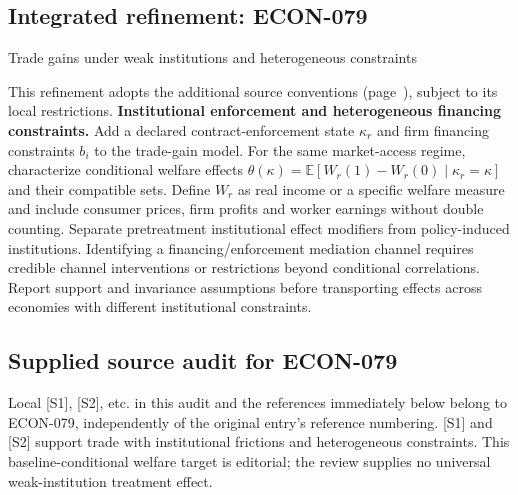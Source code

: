 \documentclass[11pt,a4paper]{article}
\begin{document}
\subsection*{Integrated refinement: ECON-079}
{\sffamily\small\color{muted}Trade gains under weak institutions and heterogeneous constraints\par}
This refinement adopts the additional source conventions
(page~\pageref{audited:conventions}), subject to its local restrictions.
\textbf{Institutional enforcement and heterogeneous financing constraints.}
Add a declared contract-enforcement state $\kappa_r$ and firm financing
constraints $b_i$ to the trade-gain model. For the same market-access regime,
characterize conditional welfare effects
$\theta(\kappa)=\mathbb E[W_r(1)-W_r(0)\mid\kappa_r=\kappa]$ and their compatible
sets. Define $W_r$ as real income or a specific welfare measure and include
consumer prices, firm profits and worker earnings without double counting.
Separate pretreatment institutional effect modifiers from policy-induced
institutions. Identifying a financing/enforcement mediation channel requires
credible channel interventions or restrictions beyond conditional correlations.
Report support and invariance assumptions before transporting effects across
economies with different institutional constraints.
\subsection*{Supplied source audit for ECON-079}
Local [S1], [S2], etc. in this audit and the references immediately below
belong to ECON-079, independently of the original entry's reference numbering.
[S1] and [S2] support trade with institutional frictions and heterogeneous constraints. This baseline-conditional welfare target is editorial; the review supplies no universal weak-institution treatment effect.
\end{document}
